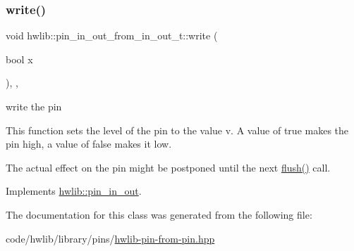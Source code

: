 \subsubsection{\texorpdfstring{write()}{write()}}
{\footnotesize\ttfamily void hwlib\+::pin\+\_\+in\+\_\+out\+\_\+from\+\_\+in\+\_\+out\+\_\+t\+::write (\begin{DoxyParamCaption}\item[{bool}]{x }\end{DoxyParamCaption})\hspace{0.3cm}{\ttfamily [inline]}, {\ttfamily [override]}, {\ttfamily [virtual]}}

write the pin

This function sets the level of the pin to the value v. A value of true makes the pin high, a value of false makes it low.

The actual effect on the pin might be postponed until the next \hyperlink{classhwlib_1_1pin__in__out__from__in__out__t_a652dca78cb01191780f571b7f31e6e77}{flush()} call. 

Implements \hyperlink{classhwlib_1_1pin__in__out_aa5e2adcb5707f86c20b6306fc09f1582}{hwlib\+::pin\+\_\+in\+\_\+out}.



The documentation for this class was generated from the following file\+:\begin{DoxyCompactItemize}
\item 
code/hwlib/library/pins/\hyperlink{hwlib-pin-from-pin_8hpp}{hwlib-\/pin-\/from-\/pin.\+hpp}\end{DoxyCompactItemize}
